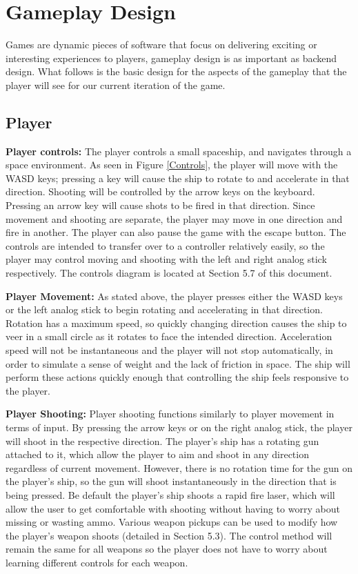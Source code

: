 \documentclass[12pt]{article}       %
\begin{document}
\section{Gameplay Design} %
\label{sec:GPdesign}

Games are dynamic pieces of software that focus on delivering exciting or interesting experiences to players, gameplay design is as important as backend design. What follows is the basic design for the aspects of the gameplay that the player will see for our current iteration of the game.

\subsection{Player} %

	{\bf Player controls: }The player controls a small spaceship, and navigates through a space environment. As seen in Figure \ref{Controls}, the player will move with the WASD keys; pressing a key will cause the ship to rotate to and accelerate in that direction.  Shooting will be controlled by the arrow keys on the keyboard. Pressing an arrow key will cause shots to be fired in that direction. Since movement and shooting are separate, the player may move in one direction and fire in another.  The player can also pause the game with the escape button. The controls are intended to transfer over to a controller relatively easily, so the player may control moving and shooting with the left and right analog stick respectively. The controls diagram is located at Section 5.7 of this document.

	{\bf Player Movement:}	As stated above, the player presses either the WASD keys or the left analog stick to begin rotating and accelerating in that direction. Rotation has a maximum speed, so quickly changing direction causes the ship to veer in a small circle as it rotates to face the intended direction. Acceleration speed will not be instantaneous and the player will not stop automatically, in order to simulate a sense of weight and the lack of friction in space. The ship will perform these actions quickly enough that controlling the ship feels responsive to the player.

	{\bf Player Shooting:} Player shooting functions similarly to player movement in terms of input. By pressing the arrow keys or on the right analog stick, the player will shoot in the respective direction. The player's ship has a rotating gun attached to it, which allow the player to aim and shoot in any direction regardless of current movement. However, there is no rotation time for the gun on the player's ship, so the gun will shoot instantaneously in the direction that is being pressed. Be default the player's ship shoots a rapid fire laser, which will allow the user to get comfortable with shooting without having to worry about missing or wasting ammo. Various weapon pickups can be used to modify how the player's weapon shoots (detailed in Section 5.3). The control method will remain the same for all weapons so the player does not have to worry about learning different controls for each weapon.
\end{document}

